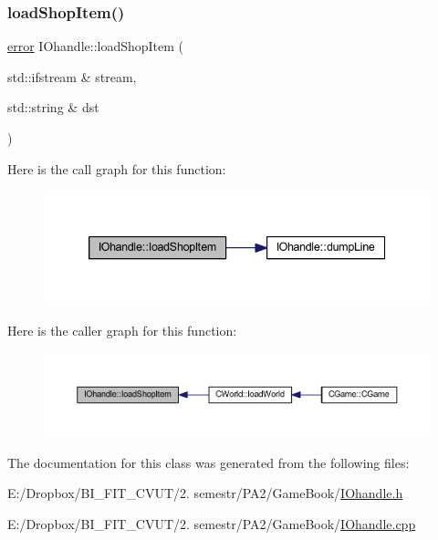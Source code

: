 \subsubsection{\texorpdfstring{load\+Shop\+Item()}{loadShopItem()}}
{\footnotesize\ttfamily \mbox{\hyperlink{_errors_list_8h_af10dacfa214e2575bb2e0ee407c242e0}{error}} I\+Ohandle\+::load\+Shop\+Item (\begin{DoxyParamCaption}\item[{std\+::ifstream \&}]{stream,  }\item[{std\+::string \&}]{dst }\end{DoxyParamCaption})}

Here is the call graph for this function\+:\nopagebreak
\begin{figure}[H]
\begin{center}
\leavevmode
\includegraphics[width=339pt]{class_i_ohandle_a4870dc9635a6c30ef483d699dffd8774_cgraph}
\end{center}
\end{figure}
Here is the caller graph for this function\+:\nopagebreak
\begin{figure}[H]
\begin{center}
\leavevmode
\includegraphics[width=350pt]{class_i_ohandle_a4870dc9635a6c30ef483d699dffd8774_icgraph}
\end{center}
\end{figure}


The documentation for this class was generated from the following files\+:\begin{DoxyCompactItemize}
\item 
E\+:/\+Dropbox/\+B\+I\+\_\+\+F\+I\+T\+\_\+\+C\+V\+U\+T/2. semestr/\+P\+A2/\+Game\+Book/\mbox{\hyperlink{_i_ohandle_8h}{I\+Ohandle.\+h}}\item 
E\+:/\+Dropbox/\+B\+I\+\_\+\+F\+I\+T\+\_\+\+C\+V\+U\+T/2. semestr/\+P\+A2/\+Game\+Book/\mbox{\hyperlink{_i_ohandle_8cpp}{I\+Ohandle.\+cpp}}\end{DoxyCompactItemize}
